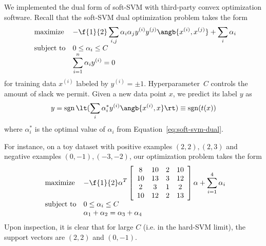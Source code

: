\documentclass{article}
\DeclareMathOperator{\sgn}{sgn}
\newcommand{\sind}[1]{^{(#1)}}
\begin{document}
\begin{multicols}{2}
We implemented the dual form of soft-SVM
with third-party convex optimization software.
Recall that the soft-SVM dual optimization problem takes the form
\begin{equation}
    \label{eq:soft-svm-dual}
    \begin{array}{ll@{}ll}
        \text{maximize}  &\displaystyle -\f{1}{2}\sum_{i,j} \alpha_i \alpha_j y\sind{i} y\sind{j} \angb{x\sind{i}, x\sind{j}}
        +
        \sum_i \alpha_i \\
        \text{subject to}& 0 \le \alpha_i \le C\\
        & \displaystyle\sum_{i=1}^n \alpha_i y\sind{i} = 0
    \end{array}
\end{equation}
for training data $x\sind{i}$
labeled by $y\sind i = \pm 1$.
Hyperparameter~$C$ controls the amount of slack we permit.
Given a new data point $x$,
we predict its label $y$ as
\begin{equation}
    \label{eq:soft-svm-predict}
    y = \sgn\lt(\sum_i \alpha^*_i y\sind{i} \angb{x\sind{i}, x}\rt) \equiv \sgn(t(x))
\end{equation}
where $\alpha^*_i$ is the optimal value of $\alpha_i$
from Equation~\ref{eq:soft-svm-dual}.

For instance, on a toy dataset with positive examples
$(2, 2), (2, 3)$ and negative examples $(0, -1), (-3, -2)$,
our optimization problem takes the form
\begin{equation}
    \label{eq:soft-svm-dual-concrete}
    \begin{array}{ll@{}ll}
        \text{maximize}  &\displaystyle -\f{1}{2}\alpha^T
        \left[
            \begin{array}{cccc}
                8 & 10 & 2 & 10 \\
                10 & 13 & 3 & 12 \\
                2 & 3 & 1 & 2 \\
                10 & 12 & 2 & 13
            \end{array}
        \right]
        \alpha
        +
        \sum_{i=1}^4 \alpha_i \\
        \text{subject to}& 0 \le \alpha_i \le C\\
        & \alpha_1 + \alpha_2 = \alpha_3 + \alpha_4
    \end{array}
\end{equation}
Upon inspection,
it is clear that for large $C$
(i.e. in the hard-SVM limit),
the support vectors are $(2,2)$ and $(0,-1)$.



\end{multicols}
\end{document}
